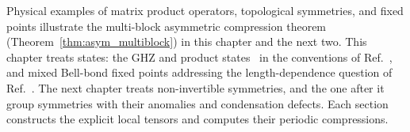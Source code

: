Physical examples of matrix product operators, topological symmetries, and
fixed points illustrate the multi-block asymmetric compression theorem
(Theorem~\ref{thm:asym_multiblock}) in this chapter and the next two. This
chapter treats states: the GHZ and product
states~\cite{GreenbergerHorneZeilinger1989,Greenberger1990Bell} in the
conventions of Ref.~\cite[Appendix~A]{Cirac2021Matrix}, and mixed Bell-bond
fixed points addressing the length-dependence question
of Ref.~\cite[Theorem~4.14]{Cirac2016MPDO_arXiv}. The next chapter treats
non-invertible symmetries, and the one after it group symmetries with their
anomalies and condensation defects. Each section constructs the explicit
local tensors and computes their periodic compressions.


%
%
